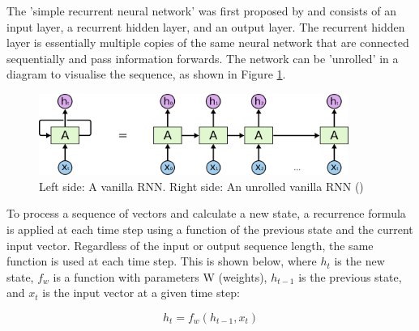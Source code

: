 The 'simple recurrent neural network' was first proposed by \cite{elman_original_rnn_1990} and consists of an input layer, a recurrent hidden layer, and an output layer. The recurrent hidden layer is essentially multiple copies of the same neural network that are connected sequentially and pass information forwards. The network can be 'unrolled' in a diagram to visualise the sequence, as shown in Figure \ref{fig:rnn_unrolled}.

\begin{figure}[ht!]
\centering
\includegraphics[width=0.9\textwidth]{media/literature/machine_learning/ml_rnn_unrolled.png}
\caption[Unrolled Recurrent Neural Network]{Left side: A vanilla \acrlong{RNN}. Right side: An unrolled vanilla \acrlong{RNN} (\cite{colah_lstm_2019})}
\label{fig:rnn_unrolled}
\end{figure}

To process a sequence of vectors and calculate a new state, a recurrence formula is applied at each time step using a function of the previous state and the current input vector. Regardless of the input or output sequence length, the same function is used at each time step. This is shown below, where $h_t$ is the new state, $f_w$ is a function with parameters W (weights), $h_{t-1}$ is the previous state, and $x_t$ is the input vector at a given time step: 

\begin{equation}
    h_{t} = f_{w} \left ( h_{t-1},x_{t} \right )
\end{equation}

